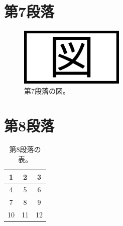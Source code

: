 \documentclass[a4paper, platex, dvipdfmx]{jsarticle}
\begin{document}
\section{第7段落}
\lipsum[7]

\begin{figure}[H]
  \centering
  \includegraphics[width=5cm]{sample.png}
  \caption{第7段落の図。}
\end{figure}

\section{第8段落}
\lipsum[8]

\begin{table}[H]
  \centering
  \caption{第8段落の表。}
  \begin{tabular}{ccc}
    \hline
    1 & 2 & 3 \\\hline
    4 & 5 & 6\\
    7 & 8 & 9 \\
    10 & 11 & 12 \\\hline
  \end{tabular}
\end{table}
\end{document}
